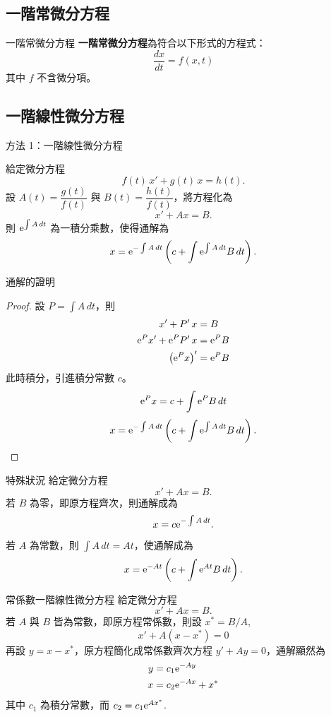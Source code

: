 \documentclass{beamer}
\newcommand  {\e}{\textup e}
\theoremstyle{remark}
\begin{document}
\begin{CJK}{UTF8}{bsmi}
\section[一階 ODE]{一階常微分方程}
\begin{frame}{一階常微分方程}
  \textbf{一階常微分方程}為符合以下形式的方程式：
  \[ \frac{dx}{dt} = f(x,t) \]
  其中 $f$ 不含微分項。
\end{frame}

\subsection[線性]{一階線性微分方程}
\begin{frame}{方法 1：一階線性微分方程}
  \begin{theorem}
    給定微分方程
    \[f(t)\,x' + g(t)\,x = h(t).\]
    設 $A(t) = \dfrac{g(t)}{f(t)}$ 與 $B(t) = \dfrac{h(t)}{f(t)}$，將方程化為
    \[x' + Ax = B.\]
    則 $\e^{\int A\,dt}$ 為一積分乘數，使得通解為
    \[x = \e^{-\int A\,dt} \left( c + \int \e^{\int A\,dt} B\,dt \right).\]
  \end{theorem}
\end{frame}

\begin{frame}{通解的證明}
  \begin{proof}
    設 $P = \int A\,dt$，則
    \begin{align*}
      x' + P'\,x &= B \\
      \e^P x' + \e^P P'\,x &= \e^P B \\
      \left( \e^P x \right)' &= \e^P B
    \end{align*}
    此時積分，引進積分常數 $c$。
    \[ \e^P x = c + \int \e^P B\,dt \]
    \[x = \e^{-\int A\,dt} \left( c + \int \e^{\int A\,dt} B\,dt \right). \qedhere\]
  \end{proof}
\end{frame}

\begin{frame}{特殊狀況}
  給定微分方程
  \[x' + Ax = B.\]
  若 $B$ 為零，即原方程齊次，則通解成為
  \[x = c\e^{-\int A\,dt}.\]
  若 $A$ 為常數，則 $\int A\,dt = At$，使通解成為
  \[x = \e^{-At} \left( c + \int \e^{At} B\,dt \right).\]
\end{frame}

\begin{frame}{常係數一階線性微分方程}
  給定微分方程
  \[x' + Ax = B.\]
  若 $A$ 與 $B$ 皆為常數，即原方程常係數，則設 $x^* = B/A$,
  \[x' + A \left( x - x^* \right) = 0\]
  再設 $y = x - x^*$，原方程簡化成常係數齊次方程
  $y' + Ay = 0$，通解顯然為
  \begin{align*}
    y &= c_1 \e^{-Ay} \\
    x &= c_2 \e^{-Ax} + x^*
  \end{align*}
  其中 $c_1$ 為積分常數，而 $c_2 = c_1 \e^{Ax^*}$.
\end{frame}


\end{CJK}
\end{document}
